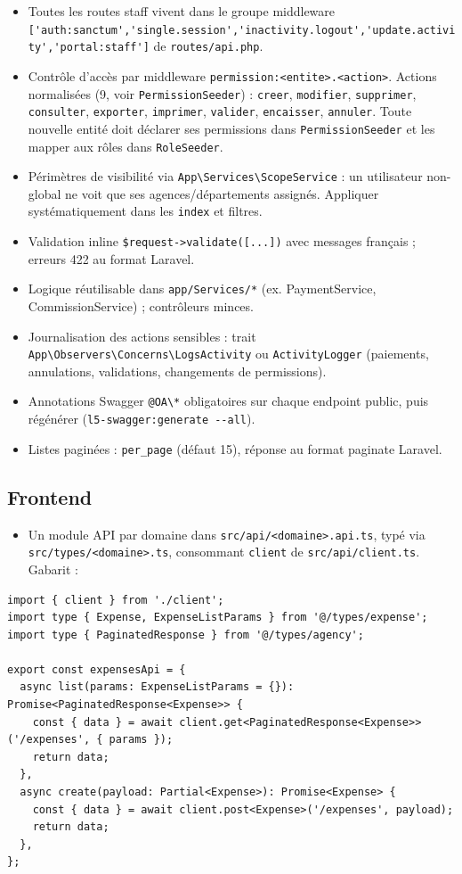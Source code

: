 \documentclass[11pt,a4paper]{article}
\begin{document}
\begin{itemize}[nosep]
  \item Toutes les routes staff vivent dans le groupe middleware \verb|['auth:sanctum','single.session','inactivity.logout','update.activity','portal:staff']| de \verb|routes/api.php|.
  \item Contrôle d'accès par middleware \verb|permission:<entite>.<action>|. Actions normalisées (9, voir \verb|PermissionSeeder|) : \verb|creer|, \verb|modifier|, \verb|supprimer|, \verb|consulter|, \verb|exporter|, \verb|imprimer|, \verb|valider|, \verb|encaisser|, \verb|annuler|. Toute nouvelle entité doit déclarer ses permissions dans \verb|PermissionSeeder| et les mapper aux rôles dans \verb|RoleSeeder|.
  \item Périmètres de visibilité via \verb|App\Services\ScopeService| : un utilisateur non-global ne voit que ses agences/départements assignés. Appliquer systématiquement dans les \verb|index| et filtres.
  \item Validation inline \verb|$request->validate([...])| avec messages français ; erreurs 422 au format Laravel.
  \item Logique réutilisable dans \verb|app/Services/*| (ex. PaymentService, CommissionService) ; contrôleurs minces.
  \item Journalisation des actions sensibles : trait \verb|App\Observers\Concerns\LogsActivity| ou \verb|ActivityLogger| (paiements, annulations, validations, changements de permissions).
  \item Annotations Swagger \verb|@OA\*| obligatoires sur chaque endpoint public, puis régénérer (\verb|l5-swagger:generate --all|).
  \item Listes paginées : \verb|per_page| (défaut 15), réponse au format paginate Laravel.
\end{itemize}

\subsection{Frontend}

\begin{itemize}[nosep]
  \item Un module API par domaine dans \verb|src/api/<domaine>.api.ts|, typé via \verb|src/types/<domaine>.ts|, consommant \verb|client| de \verb|src/api/client.ts|. Gabarit :
\end{itemize}

\begin{lstlisting}
import { client } from './client';
import type { Expense, ExpenseListParams } from '@/types/expense';
import type { PaginatedResponse } from '@/types/agency';

export const expensesApi = {
  async list(params: ExpenseListParams = {}): Promise<PaginatedResponse<Expense>> {
    const { data } = await client.get<PaginatedResponse<Expense>>('/expenses', { params });
    return data;
  },
  async create(payload: Partial<Expense>): Promise<Expense> {
    const { data } = await client.post<Expense>('/expenses', payload);
    return data;
  },
};
\end{lstlisting}
\end{document}
